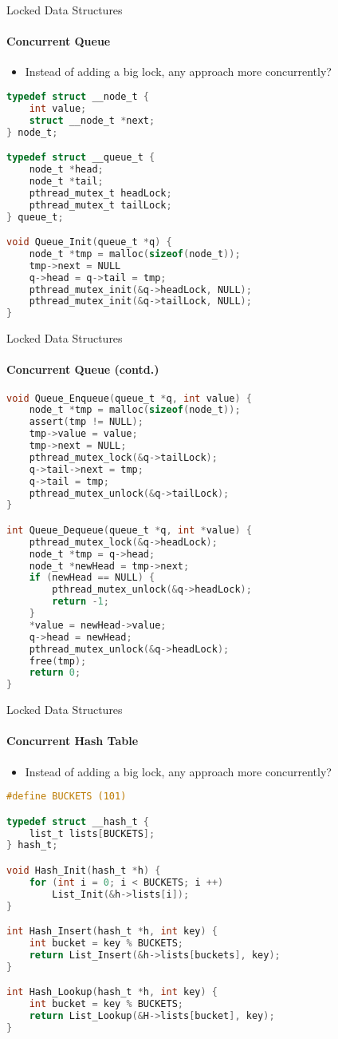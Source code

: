 \documentclass[10pt]{beamer}
\begin{document}
\begin{frame}[fragile]{Locked Data Structures}
\framesubtitle{Concurrent Queue}
\begin{itemize}
 
\item Instead of adding a big lock, any approach more concurrently?
\end{itemize}
\begin{lstlisting}[language=C]
typedef struct __node_t {
	int value;
 	struct __node_t *next;
} node_t;

typedef struct __queue_t {
	node_t *head;
	node_t *tail;
	pthread_mutex_t headLock;
	pthread_mutex_t tailLock;
} queue_t;

void Queue_Init(queue_t *q) {
	node_t *tmp = malloc(sizeof(node_t));
	tmp->next = NULL
	q->head = q->tail = tmp;
	pthread_mutex_init(&q->headLock, NULL);
	pthread_mutex_init(&q->tailLock, NULL);
}
\end{lstlisting}
\end{frame}

\begin{frame}[fragile]{Locked Data Structures}
\framesubtitle{Concurrent Queue (contd.)}
\begin{lstlisting}[language=C]
void Queue_Enqueue(queue_t *q, int value) {
	node_t *tmp = malloc(sizeof(node_t));
	assert(tmp != NULL);
	tmp->value = value;
	tmp->next = NULL;
	pthread_mutex_lock(&q->tailLock);
	q->tail->next = tmp;
	q->tail = tmp;
	pthread_mutex_unlock(&q->tailLock);
}

int Queue_Dequeue(queue_t *q, int *value) {
	pthread_mutex_lock(&q->headLock);
	node_t *tmp = q->head;
	node_t *newHead = tmp->next;
	if (newHead == NULL) {
		pthread_mutex_unlock(&q->headLock);
		return -1;
	}
	*value = newHead->value;
	q->head = newHead;
	pthread_mutex_unlock(&q->headLock);
	free(tmp);
	return 0;
}
\end{lstlisting}
\end{frame}

\begin{frame}[fragile]{Locked Data Structures}
\framesubtitle{Concurrent Hash Table}
\begin{itemize}
 
\item Instead of adding a big lock, any approach more concurrently?
\end{itemize}
\begin{lstlisting}[language=C]
#define BUCKETS (101)

typedef struct __hash_t {
	list_t lists[BUCKETS];
} hash_t;

void Hash_Init(hash_t *h) {
	for (int i = 0; i < BUCKETS; i ++)
		List_Init(&h->lists[i]);
}

int Hash_Insert(hash_t *h, int key) {
	int bucket = key % BUCKETS;
	return List_Insert(&h->lists[buckets], key);
}

int Hash_Lookup(hash_t *h, int key) {
	int bucket = key % BUCKETS;
	return List_Lookup(&H->lists[bucket], key);
}
\end{lstlisting}
\end{frame}
\end{document}

